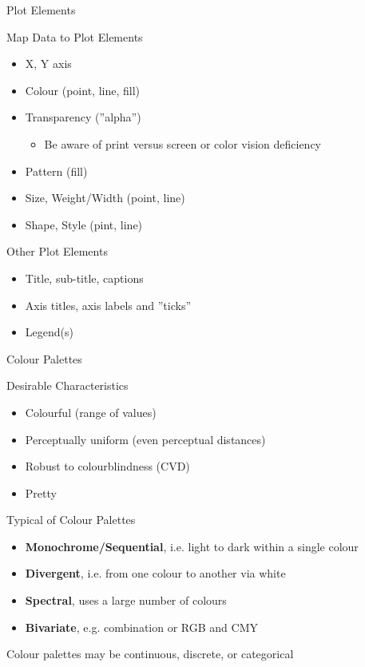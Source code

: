\documentclass[ignorenonframetext,xcolor=x11names]{beamer}
\begin{document}
\begin{frame}{Plot Elements}
	\begin{block}{Map Data to Plot Elements}
	\begin{itemize}
		\item X, Y axis
		\item Colour (point, line, fill)
		\item Transparency (''alpha'')
		\begin{itemize}
		   \item \alert{Be aware of print versus screen or color vision deficiency}
		\end{itemize}
		\item Pattern (fill)
		\item Size, Weight/Width (point, line)
		\item Shape, Style (pint, line)
	\end{itemize}
	\end{block}
	\begin{block}{Other Plot Elements}
		\begin{itemize}
			\item Title, sub-title, captions
			\item Axis titles, axis labels and ''ticks''
			\item Legend(s)
		\end{itemize}
	\end{block}
\end{frame}

\begin{frame}{Colour Palettes}
\begin{block}{Desirable Characteristics}
\begin{itemize} 
  \item Colourful (range of values)
  \item Perceptually uniform (even perceptual distances)
  \item Robust to colourblindness (CVD)
  \item Pretty
\end{itemize}
\end{block}

\begin{block}{Typical of Colour Palettes}
\begin{itemize}
  \item {\bf Monochrome/Sequential}, i.e. light to dark within a single colour
  \item {\bf Divergent}, i.e. from one colour to another via white
  \item {\bf Spectral}, uses a large number of colours
  \item {\bf Bivariate}, e.g. combination or RGB and CMY
\end{itemize}
Colour palettes may be continuous, discrete, or categorical
\end{block}
\end{frame}
\end{document}
